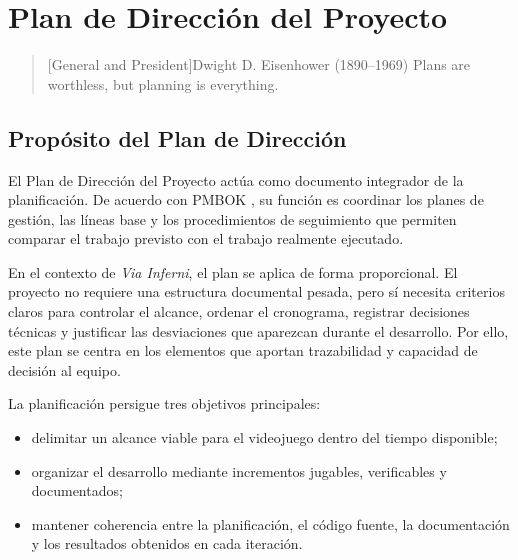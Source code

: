 \chapter{Plan de Dirección del Proyecto}

\begin{quotation}[General and President]{Dwight D. Eisenhower (1890--1969)}
Plans are worthless, but planning is everything.
\end{quotation}

\begin{abstract}
En este capítulo se define el Plan de Dirección del Proyecto de \textit{Via Inferni},
tomando como referencia el marco PMBOK y seleccionando los procesos que resultan útiles
para un Trabajo de Fin de Grado desarrollado por dos estudiantes de Ingeniería Informática.
El propósito del capítulo es establecer el marco de dirección que integra los planes
subsidiarios, las líneas base, los mecanismos de control y los criterios de cierre del
proyecto \cite{pmbok2021}.
\end{abstract}

\section{Propósito del Plan de Dirección}
El Plan de Dirección del Proyecto actúa como documento integrador de la planificación. De
acuerdo con PMBOK \cite{pmbok2021}, su función es coordinar los planes de gestión, las
líneas base y los procedimientos de seguimiento que permiten comparar el trabajo previsto
con el trabajo realmente ejecutado.

En el contexto de \textit{Via Inferni}, el plan se aplica de forma proporcional. El
proyecto no requiere una estructura documental pesada, pero sí necesita criterios claros
para controlar el alcance, ordenar el cronograma, registrar decisiones técnicas y justificar
las desviaciones que aparezcan durante el desarrollo. Por ello, este plan se centra en los
elementos que aportan trazabilidad y capacidad de decisión al equipo.

La planificación persigue tres objetivos principales:

\begin{itemize}
    \item delimitar un alcance viable para el videojuego dentro del tiempo disponible;
    \item organizar el desarrollo mediante incrementos jugables, verificables y documentados;
    \item mantener coherencia entre la planificación, el código fuente, la documentación y
    los resultados obtenidos en cada iteración.
\end{itemize}

